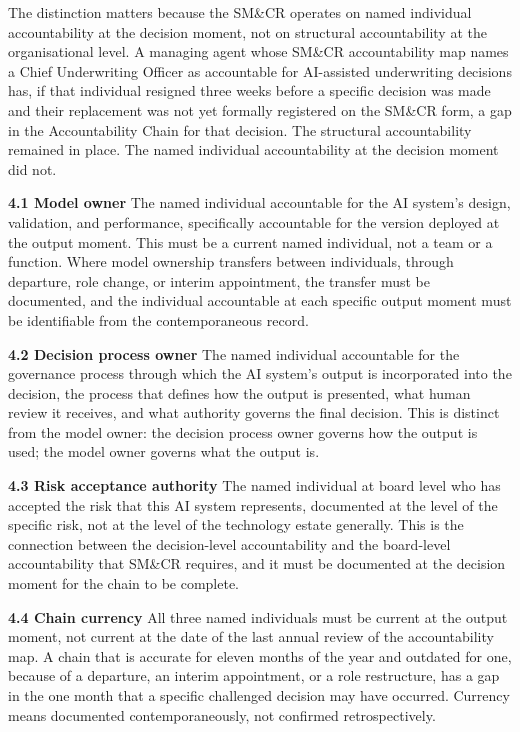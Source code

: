 The distinction matters because the SM\&CR operates on named individual accountability at the decision moment, not on structural accountability at the organisational level. A managing agent whose SM\&CR accountability map names a Chief Underwriting Officer as accountable for AI-assisted underwriting decisions has, if that individual resigned three weeks before a specific decision was made and their replacement was not yet formally registered on the SM\&CR form, a gap in the Accountability Chain for that decision. The structural accountability remained in place. The named individual accountability at the decision moment did not.

\textbf{4.1 Model owner} The named individual accountable for the AI system's design, validation, and performance, specifically accountable for the version deployed at the output moment. This must be a current named individual, not a team or a function. Where model ownership transfers between individuals, through departure, role change, or interim appointment, the transfer must be documented, and the individual accountable at each specific output moment must be identifiable from the contemporaneous record.

\textbf{4.2 Decision process owner} The named individual accountable for the governance process through which the AI system's output is incorporated into the decision, the process that defines how the output is presented, what human review it receives, and what authority governs the final decision. This is distinct from the model owner: the decision process owner governs how the output is used; the model owner governs what the output is.

\textbf{4.3 Risk acceptance authority} The named individual at board level who has accepted the risk that this AI system represents, documented at the level of the specific risk, not at the level of the technology estate generally. This is the connection between the decision-level accountability and the board-level accountability that SM\&CR requires, and it must be documented at the decision moment for the chain to be complete.

\textbf{4.4 Chain currency} All three named individuals must be current at the output moment, not current at the date of the last annual review of the accountability map. A chain that is accurate for eleven months of the year and outdated for one, because of a departure, an interim appointment, or a role restructure, has a gap in the one month that a specific challenged decision may have occurred. Currency means documented contemporaneously, not confirmed retrospectively.

